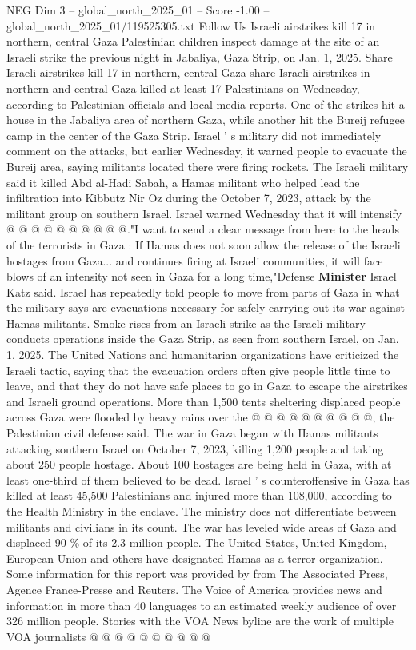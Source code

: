 \begin{textsample}{NEG Dim 3 – global\_north\_2025\_01 – Score -1.00 – global\_north\_2025\_01/119525305.txt}  \label{ex:f3_neg_193}
Follow Us Israeli airstrikes kill 17 in northern, central Gaza Palestinian children inspect damage at the site of an Israeli strike the previous night in Jabaliya, Gaza Strip, on Jan. 1, 2025.
Share Israeli airstrikes kill 17 in northern, central Gaza share Israeli airstrikes in northern and central Gaza killed at least 17 Palestinians on Wednesday, according to Palestinian officials and local media reports.
One of the strikes hit a house in the Jabaliya area of northern Gaza, while another hit the Bureij refugee camp in the center of the Gaza Strip.
Israel ' s military did not immediately comment on the attacks, but earlier Wednesday, it warned people to evacuate the Bureij area, saying militants located there were firing rockets.
The Israeli military said it killed Abd al-Hadi Sabah, a Hamas militant who helped lead the infiltration into Kibbutz Nir Oz during the October 7, 2023, attack by the militant group on southern Israel.
Israel warned Wednesday that it will intensify @ @ @ @ @ @ @ @ @ @."I want to send a clear message from here to the heads of the terrorists in Gaza : If Hamas does not soon allow the release of the Israeli hostages from Gaza... and continues firing at Israeli communities, it will face blows of an intensity not seen in Gaza for a long time,"Defense \textbf{Minister} Israel Katz said.
Israel has repeatedly told people to move from parts of Gaza in what the military says are evacuations necessary for safely carrying out its war against Hamas militants.
Smoke rises from an Israeli strike as the Israeli military conducts operations inside the Gaza Strip, as seen from southern Israel, on Jan. 1, 2025.
The United Nations and humanitarian organizations have criticized the Israeli tactic, saying that the evacuation orders often give people little time to leave, and that they do not have safe places to go in Gaza to escape the airstrikes and Israeli ground operations.
More than 1,500 tents sheltering displaced people across Gaza were flooded by heavy rains over the @ @ @ @ @ @ @ @ @ @, the Palestinian civil defense said.
The war in Gaza began with Hamas militants attacking southern Israel on October 7, 2023, killing 1,200 people and taking about 250 people hostage.
About 100 hostages are being held in Gaza, with at least one-third of them believed to be dead.
Israel ' s counteroffensive in Gaza has killed at least 45,500 Palestinians and injured more than 108,000, according to the Health Ministry in the enclave.
The ministry does not differentiate between militants and civilians in its count.
The war has leveled wide areas of Gaza and displaced 90 \% of its 2.3 million people.
The United States, United Kingdom, European Union and others have designated Hamas as a terror organization.
Some information for this report was provided by from The Associated Press, Agence France-Presse and Reuters.
The Voice of America provides news and information in more than 40 languages to an estimated weekly audience of over 326 million people.
Stories with the VOA News byline are the work of multiple VOA journalists @ @ @ @ @ @ @ @ @ @

\end{textsample}
